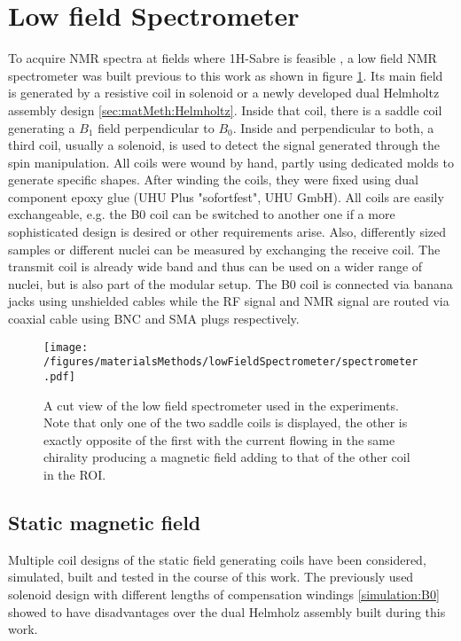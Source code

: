         \section{Low field Spectrometer}
        \label{chap:MaterialsAndMethods:lowFieldSpectrometer}
        To acquire NMR spectra at fields where 1H-Sabre is feasible \cite{rayner_signal_2018}, a low field NMR spectrometer was built \cite{borowiak_battery-driven_2013-1} previous to this work as shown in figure \ref{figure:materialsMethods:lowFieldSpec}. Its main field is generated by a resistive coil in solenoid or a newly developed dual Helmholtz assembly design \ref{sec:matMeth:Helmholtz}. Inside that coil, there is a saddle coil generating a $B_1$ field perpendicular to $B_0$. Inside and perpendicular to both, a third coil, usually a solenoid, is used to detect the signal generated through the spin manipulation. All coils were wound by hand, partly using dedicated molds to generate specific shapes. After winding the coils, they were fixed using dual component epoxy glue (UHU Plus "sofortfest", UHU GmbH).
        All coils are easily exchangeable, e.g. the B0 coil can be switched to another one if a more sophisticated design is desired or other requirements arise. Also, differently sized samples or different nuclei can be measured by exchanging the receive coil. The transmit coil is already wide band and thus can be used on a wider range of nuclei, but is also part of the modular setup. The B0 coil is connected via banana jacks using unshielded cables while the RF signal and NMR signal are routed via coaxial cable using BNC  and SMA plugs respectively.
        \begin{figure}
            \label{figure:matMeth:lowFieldSpectrometer}
            \texttt{[image: /figures/materialsMethods/lowFieldSpectrometer/spectrometer.pdf]}
            \caption[Schematic view low field spectrometer]{A cut view of the low field spectrometer used in the experiments. Note that only one of the two saddle coils is displayed, the other is exactly opposite of the first with the current flowing in the same chirality producing a magnetic field adding to that of the other coil in the ROI. }
            \label{figure:materialsMethods:lowFieldSpec}
        \end{figure}
        \subsection{Static magnetic field}
            Multiple coil designs of the static field generating coils have been  considered, simulated, built and tested in the course of this work. The previously used solenoid design with different lengths of compensation windings \ref{simulation:B0} showed to have disadvantages over the dual Helmholz assembly built during this work.
